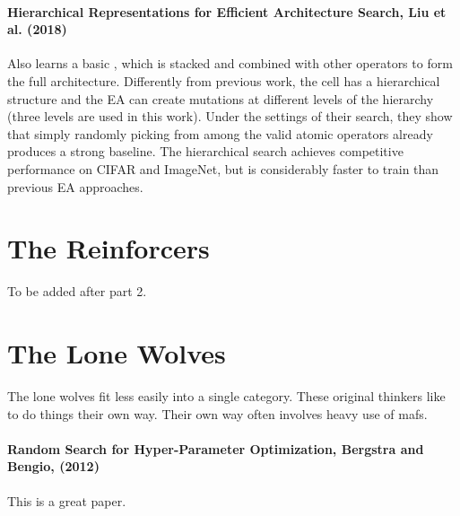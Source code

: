 \documentclass[10pt]{article}
\begin{document}
\paragraph{Hierarchical Representations for Efficient Architecture Search, Liu et al. (2018) \cite{liu2017hierarchical}} Also learns a basic , which is stacked and combined with other operators to form the full architecture.  Differently from previous work, the cell has a hierarchical structure and the EA can create mutations at different levels of the hierarchy (three levels are used in this work).  Under the settings of their search, they show that simply randomly picking from among the valid atomic operators already produces a strong baseline.  The hierarchical search achieves competitive performance on CIFAR and ImageNet, but is considerably faster to train than previous EA approaches. 



\section{The Reinforcers}

To be added after part 2.

\section{The Lone Wolves}

The lone wolves fit less easily into a single category.  These original thinkers like to do things their own way. Their own way often involves heavy use of mafs. 

\paragraph{Random Search for Hyper-Parameter Optimization, Bergstra and Bengio, (2012) \cite{bergstra2012random}} This is a great paper. 






\end{document}
